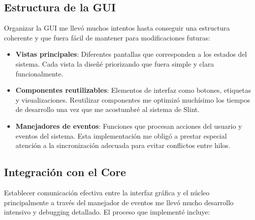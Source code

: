 \subsection{Estructura de la GUI}

Organizar la GUI me llevó muchos intentos hasta conseguir una estructura coherente y que fuera fácil de mantener para modificaciones futuras:

\begin{itemize}
    \item \textbf{Vistas principales}: Diferentes pantallas que corresponden a los estados del sistema. Cada vista la diseñé priorizando que fuera simple y clara funcionalmente.
    \item \textbf{Componentes reutilizables}: Elementos de interfaz como botones, etiquetas y visualizaciones. Reutilizar componentes me optimizó muchísimo los tiempos de desarrollo una vez que me acostumbré al sistema de Slint.
    \item \textbf{Manejadores de eventos}: Funciones que procesan acciones del usuario y eventos del sistema. Esta implementación me obligó a prestar especial atención a la sincronización adecuada para evitar conflictos entre hilos.
\end{itemize}

\subsection{Integración con el Core}

Establecer comunicación efectiva entre la interfaz gráfica y el núcleo principalmente a través del manejador de eventos me llevó mucho desarrollo intensivo y debugging detallado. El proceso que implementé incluye:

